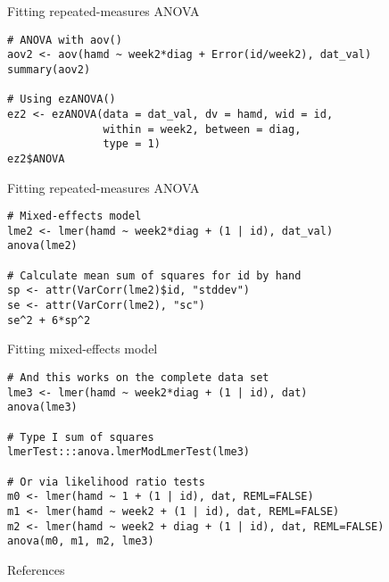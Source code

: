 \documentclass[aspectratio=169]{beamer}
\begin{document}
{

\begin{frame}[fragile]{Fitting repeated-measures ANOVA}
  \begin{lstlisting}
# ANOVA with aov()
aov2 <- aov(hamd ~ week2*diag + Error(id/week2), dat_val)
summary(aov2)

# Using ezANOVA()
ez2 <- ezANOVA(data = dat_val, dv = hamd, wid = id,
               within = week2, between = diag,
               type = 1)
ez2$ANOVA
  \end{lstlisting}
\end{frame}

\begin{frame}[fragile]{Fitting repeated-measures ANOVA}
  \begin{lstlisting}
# Mixed-effects model
lme2 <- lmer(hamd ~ week2*diag + (1 | id), dat_val)
anova(lme2)

# Calculate mean sum of squares for id by hand
sp <- attr(VarCorr(lme2)$id, "stddev")
se <- attr(VarCorr(lme2), "sc")
se^2 + 6*sp^2
  \end{lstlisting}
\end{frame}

\begin{frame}[fragile]{Fitting mixed-effects model}
  \begin{lstlisting}
# And this works on the complete data set
lme3 <- lmer(hamd ~ week2*diag + (1 | id), dat)
anova(lme3)

# Type I sum of squares
lmerTest:::anova.lmerModLmerTest(lme3)

# Or via likelihood ratio tests
m0 <- lmer(hamd ~ 1 + (1 | id), dat, REML=FALSE)
m1 <- lmer(hamd ~ week2 + (1 | id), dat, REML=FALSE)
m2 <- lmer(hamd ~ week2 + diag + (1 | id), dat, REML=FALSE)
anova(m0, m1, m2, lme3)
  \end{lstlisting}
\end{frame}

}

% 
% 
% 

\begin{frame}{References}


\vfill
\end{frame}
\end{document}
